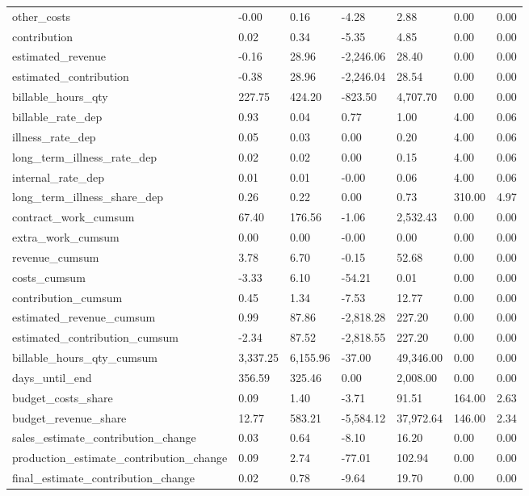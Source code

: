 \begin{landscape}
\begin{longtable}[h!]{lllllll}
other_costs & -0.00 & 0.16 & -4.28 & 2.88 & 0.00 & 0.00 \\
contribution & 0.02 & 0.34 & -5.35 & 4.85 & 0.00 & 0.00 \\
estimated_revenue & -0.16 & 28.96 & -2,246.06 & 28.40 & 0.00 & 0.00 \\
estimated_contribution & -0.38 & 28.96 & -2,246.04 & 28.54 & 0.00 & 0.00 \\
billable_hours_qty & 227.75 & 424.20 & -823.50 & 4,707.70 & 0.00 & 0.00 \\
billable_rate_dep & 0.93 & 0.04 & 0.77 & 1.00 & 4.00 & 0.06 \\
illness_rate_dep & 0.05 & 0.03 & 0.00 & 0.20 & 4.00 & 0.06 \\
long_term_illness_rate_dep & 0.02 & 0.02 & 0.00 & 0.15 & 4.00 & 0.06 \\
internal_rate_dep & 0.01 & 0.01 & -0.00 & 0.06 & 4.00 & 0.06 \\
long_term_illness_share_dep & 0.26 & 0.22 & 0.00 & 0.73 & 310.00 & 4.97 \\
contract_work_cumsum & 67.40 & 176.56 & -1.06 & 2,532.43 & 0.00 & 0.00 \\
extra_work_cumsum & 0.00 & 0.00 & -0.00 & 0.00 & 0.00 & 0.00 \\
revenue_cumsum & 3.78 & 6.70 & -0.15 & 52.68 & 0.00 & 0.00 \\
costs_cumsum & -3.33 & 6.10 & -54.21 & 0.01 & 0.00 & 0.00 \\
contribution_cumsum & 0.45 & 1.34 & -7.53 & 12.77 & 0.00 & 0.00 \\
estimated_revenue_cumsum & 0.99 & 87.86 & -2,818.28 & 227.20 & 0.00 & 0.00 \\
estimated_contribution_cumsum & -2.34 & 87.52 & -2,818.55 & 227.20 & 0.00 & 0.00 \\
billable_hours_qty_cumsum & 3,337.25 & 6,155.96 & -37.00 & 49,346.00 & 0.00 & 0.00 \\
days_until_end & 356.59 & 325.46 & 0.00 & 2,008.00 & 0.00 & 0.00 \\
budget_costs_share & 0.09 & 1.40 & -3.71 & 91.51 & 164.00 & 2.63 \\
budget_revenue_share & 12.77 & 583.21 & -5,584.12 & 37,972.64 & 146.00 & 2.34 \\
sales_estimate_contribution_change & 0.03 & 0.64 & -8.10 & 16.20 & 0.00 & 0.00 \\
production_estimate_contribution_change & 0.09 & 2.74 & -77.01 & 102.94 & 0.00 & 0.00 \\
final_estimate_contribution_change & 0.02 & 0.78 & -9.64 & 19.70 & 0.00 & 0.00 \\

\end{longtable}
\end{landscape}
